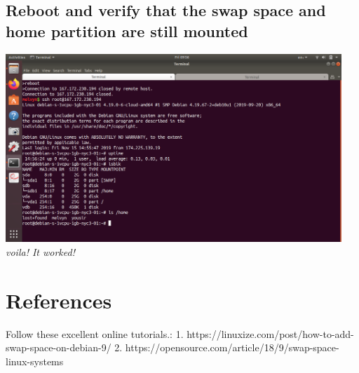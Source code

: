 \documentclass[10pt]{article}
\begin{document}
\subsection{Reboot and verify that the swap space and home partition are still
mounted}
\begin{center}
    \includegraphics[width=0.95\textwidth]{Images/11_done.png}
	\textit{voila! It worked!}
\end{center}


\section{References} Follow these excellent online tutorials.: 1.
https://linuxize.com/post/how-to-add-swap-space-on-debian-9/ 2.
https://opensource.com/article/18/9/swap-space-linux-systems
\end{document}
